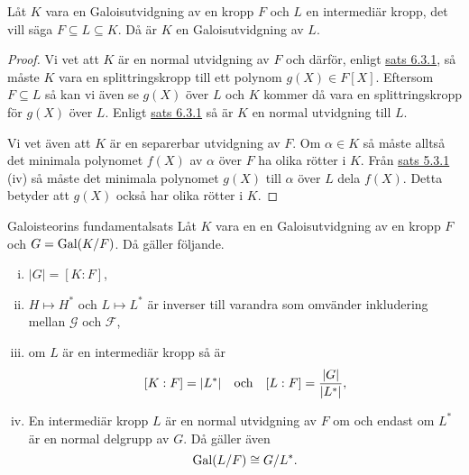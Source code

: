 \documentclass{article}
\newcommand{\gal}[0]{\textnormal{Gal}}
\theoremstyle{definition}
\begin{document}
\begin{mylemma}{}{}
  Låt $K$ vara en Galoisutvidgning av en kropp $F$ och $L$ en intermediär kropp, det vill säga $F \subseteq L \subseteq K$. Då är $K$ en 
  Galoisutvidgning av $L$.
\end{mylemma}

\begin{proof}
  Vi vet att $K$ är en normal utvidgning av $F$ och därför, enligt \hyperlink{sats6.3.1}{sats 6.3.1}, så måste $K$ vara en splittringskropp till 
  ett polynom $g(X) \in F[X]$. Eftersom $F \subseteq L$ så kan vi även se $g(X)$ över $L$ och $K$ kommer då vara en splittringskropp för $g(X)$ över $L$. 
  Enligt \hyperlink{sats6.3.1}{sats 6.3.1} så är $K$ en normal utvidgning till $L$.

  Vi vet även att $K$ är en separerbar utvidgning av $F$. Om $\alpha \in K$ så måste alltså det minimala polynomet $f(X)$ av $\alpha$ över $F$ 
  ha olika rötter i $K$. Från \hyperlink{minpol}{sats 5.3.1} (iv) så måste det minimala polynomet $g(X)$ till $\alpha$ över $L$ dela $f(X)$.
  Detta betyder att $g(X)$ också har olika rötter i $K$.
\end{proof}

\begin{mytheo}{Galoisteorins fundamentalsats}{}
  Låt $K$ vara en en Galoisutvidgning av en kropp $F$ och $G = \gal(K/F)$. Då gäller följande.
  \begin{enumerate}[(i)]
    \item $|G| = [K:F]$,
    \item $H \mapsto H^*$ och $L \mapsto L^*$ är inverser till varandra som omvänder inkludering mellan $\mathcal{G}$ och $\mathcal{F}$,
    \item om $L$ är en intermediär kropp så är 
    \[ [K:F] = |L^*| \quad \textnormal{och} \quad [L:F] = \frac{|G|}{|L^*|}, \]
    \item En intermediär kropp $L$ är en normal utvidgning av $F$ om och endast om $L^*$ är en normal delgrupp av $G$. Då gäller även 
    \[ \gal(L/F) \cong G/L^*. \]
  \end{enumerate}
\end{mytheo}
\end{document}
